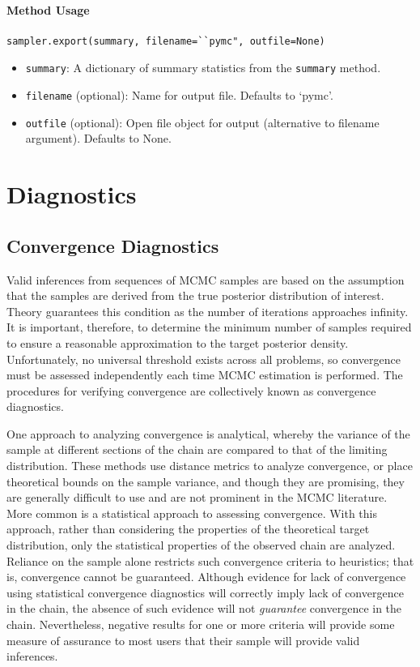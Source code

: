 \documentclass[]{book}
\begin{document}
\subsubsection{Method Usage}
\begin{verbatim}
sampler.export(summary, filename=``pymc", outfile=None)
\end{verbatim}
\begin{itemize}

\item \verb=summary=: A dictionary of summary statistics from the \verb=summary= method.
\item \verb=filename= (optional): Name for output file. Defaults to ‘pymc’.
\item \verb=outfile= (optional): Open file object for output (alternative to filename argument). Defaults to None.
\end{itemize}

\chapter{Diagnostics}

\section{Convergence Diagnostics}

Valid inferences from sequences of MCMC samples are based on the assumption that the samples are derived from the true posterior distribution of interest. Theory guarantees this condition as the number of iterations approaches infinity. It is important, therefore, to determine the minimum number of samples required to ensure a reasonable approximation to the target posterior density. Unfortunately, no universal threshold exists across all problems, so convergence must be assessed independently each time MCMC estimation is performed. The procedures for verifying convergence are collectively known as convergence diagnostics.

One approach to analyzing convergence is analytical, whereby the variance of the sample at different sections of the chain are compared to that of the limiting distribution. These methods use distance metrics to analyze convergence, or place theoretical bounds on the sample variance, and though they are promising, they are generally difficult to use and are not prominent in the MCMC literature. More common is a statistical approach to assessing convergence. With this approach, rather than considering the properties of the theoretical target distribution, only the statistical properties of the observed chain are analyzed. Reliance on the sample alone restricts such convergence criteria to heuristics; that is, convergence cannot be guaranteed. Although evidence for lack of convergence using statistical convergence diagnostics will correctly imply lack of convergence in the chain, the absence of such evidence will not \emph{guarantee} convergence in the chain. Nevertheless, negative results for one or more criteria will provide some measure of assurance to most users that their sample will provide valid inferences.
\end{document}
